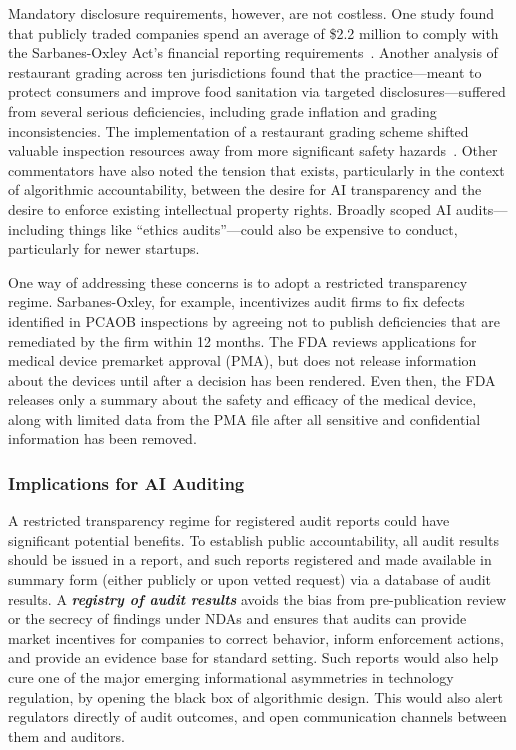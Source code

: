 \documentclass[sigconf]{acmart}
\begin{document}
Mandatory disclosure requirements, however, are not costless. One study found that publicly traded companies spend an average of \$2.2 million to comply with the Sarbanes-Oxley Act’s financial reporting requirements~\cite{krishnan2008costs}. Another analysis of restaurant grading across ten jurisdictions found that the practice—meant to protect consumers and improve food sanitation via targeted disclosures—suffered from several serious deficiencies, including grade inflation and grading inconsistencies. The implementation of a restaurant grading scheme shifted valuable inspection resources away from more significant safety hazards~\cite{ho2012fudging}. Other commentators have also noted the tension that exists, particularly in the context of algorithmic accountability, between the desire for AI transparency and the desire to enforce existing intellectual property rights. Broadly scoped AI audits—including things like “ethics audits”—could also be expensive to conduct, particularly for newer startups. 

One way of addressing these concerns is to adopt a restricted transparency regime. Sarbanes-Oxley, for example, incentivizes audit firms to fix defects identified in PCAOB inspections by agreeing not to publish deficiencies that are remediated by the firm within 12 months. The FDA reviews applications for medical device premarket approval (PMA), but does not release information about the devices until after a decision has been rendered. Even then, the FDA releases only a summary about the safety and efficacy of the medical device, along with limited data from the PMA file after all sensitive and confidential information has been removed. 


\subsubsection{Implications for AI Auditing} 

A restricted transparency regime for registered audit reports could have significant potential benefits. 
To establish public accountability, all audit results should be issued in a report, and such reports registered and made available in summary form (either publicly or upon vetted request) via a database of audit results. A \textbf{\textit{registry of audit results}} avoids the bias from pre-publication review or the secrecy of findings under NDAs and ensures that audits can provide market incentives for companies to correct behavior, inform enforcement actions, and provide an evidence base for standard setting. Such reports would also help cure one of the major emerging informational asymmetries in technology regulation, by opening the black box of algorithmic design. This would also alert regulators directly of audit outcomes, and open communication channels between them and auditors.
\end{document}
